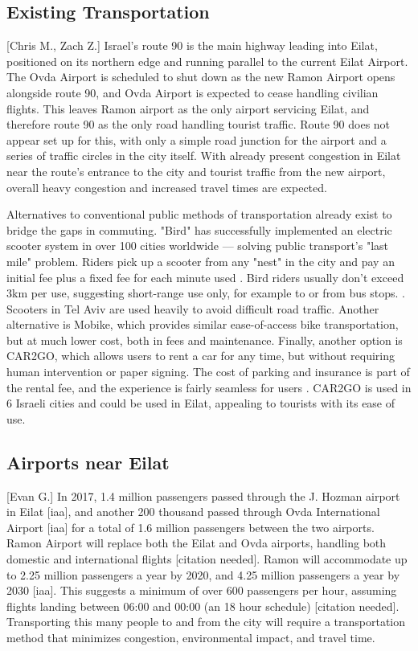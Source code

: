 \documentclass[12pt]{article}                         %
\begin{document}
\subsection{Existing Transportation}[Chris M., Zach Z.]
Israel's route 90 is the main highway leading into Eilat, positioned on its northern edge and running parallel to the current Eilat Airport. The Ovda Airport is scheduled to shut down as the new Ramon Airport opens alongside route 90, and Ovda Airport is expected to cease handling civilian flights. This leaves Ramon airport as the only airport servicing Eilat, and therefore route 90 as the only road handling tourist traffic. Route 90 does not appear set up for this, with only a simple road junction for the airport and a series of traffic circles in the city itself. With already present congestion in Eilat near the route's entrance to the city and tourist traffic from the new airport, overall heavy congestion and increased travel times are expected.

Alternatives to conventional public methods of transportation already exist to bridge the gaps in commuting. "Bird" has successfully implemented an electric scooter system in over 100 cities worldwide --- solving public transport's "last mile" problem. Riders pick up a scooter from any "nest" in the city and pay an initial fee plus a fixed fee for each minute used \cite{BirdIsrael}. Bird riders usually don't exceed 3km per use, suggesting short-range use only, for example to or from bus stops. \cite{MichaelRaz-Chaimovich2018BirdGlobes}. Scooters in Tel Aviv are used heavily to avoid difficult road traffic. Another alternative is Mobike, which provides similar ease-of-access bike transportation, but at much lower cost, both in fees and maintenance. Finally, another option is CAR2GO, which allows users to rent a car for any time, but without requiring human intervention or paper signing. The cost of parking and insurance is part of the rental fee, and the experience is fairly seamless for users \cite{OrenDoriandMeiravMoran2018IsraeliHaaretz.com}. CAR2GO is used in 6 Israeli cities and could be used in Eilat, appealing to tourists with its ease of use.

\subsection{Airports near Eilat}[Evan G.]
In 2017, 1.4 million passengers passed through the J. Hozman airport in Eilat [iaa], and another 200 thousand passed through Ovda International Airport [iaa] for a total of 1.6 million passengers between the two airports. Ramon Airport will replace both the Eilat and Ovda airports, handling both domestic and international flights [citation needed]. Ramon will accommodate up to 2.25 million passengers a year by 2020, and 4.25 million passengers a year by 2030 [iaa]. This suggests a minimum of over 600 passengers per hour, assuming flights landing between 06:00 and 00:00 (an 18 hour schedule) [citation needed]. Transporting this many people to and from the city will require a transportation method that minimizes congestion, environmental impact, and travel time.
\end{document}
